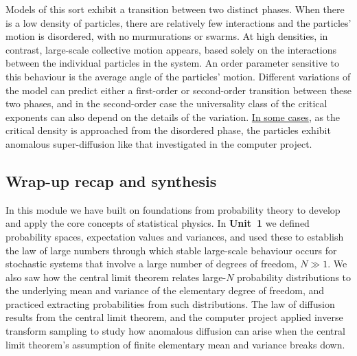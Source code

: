 Models of this sort exhibit a transition between two distinct phases.
When there is a low density of particles, there are relatively few interactions and the particles' motion is disordered, with no murmurations or swarms.
At high densities, in contrast, large-scale collective motion appears, based solely on the interactions between the individual particles in the system.
An order parameter sensitive to this behaviour is the average angle of the particles' motion.
Different variations of the model can predict either a first-order or second-order transition between these two phases, and in the second-order case the universality class of the critical exponents can also depend on the details of the variation. %
\href{https://arxiv.org/abs/cond-mat/0401208}{In some cases}, as the critical density is approached from the disordered phase, the particles exhibit anomalous super-diffusion like that investigated in the computer project. %



\subsection{Wrap-up recap and synthesis}
In this module we have built on foundations from probability theory to develop and apply the core concepts of statistical physics.
In \textbf{Unit~1} we defined probability spaces, expectation values and variances, and used these to establish the law of large numbers through which stable large-scale behaviour occurs for stochastic systems that involve a large number of degrees of freedom, $N \gg 1$.
We also saw how the central limit theorem relates large-$N$ probability distributions to the underlying mean and variance of the elementary degree of freedom, and practiced extracting probabilities from such distributions.
The law of diffusion results from the central limit theorem, and the computer project applied inverse transform sampling to study how anomalous diffusion can arise when the central limit theorem's assumption of finite elementary mean and variance breaks down.

